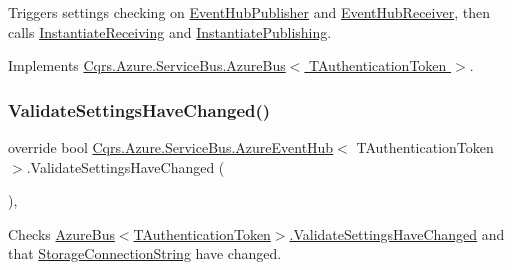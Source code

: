 Triggers settings checking on \hyperlink{classCqrs_1_1Azure_1_1ServiceBus_1_1AzureEventHub_a5f64ce36efaee0f676816c803620d05e_a5f64ce36efaee0f676816c803620d05e}{Event\+Hub\+Publisher} and \hyperlink{classCqrs_1_1Azure_1_1ServiceBus_1_1AzureEventHub_a1b12b47dbb9b9afe2014477a2e457c35_a1b12b47dbb9b9afe2014477a2e457c35}{Event\+Hub\+Receiver}, then calls \hyperlink{classCqrs_1_1Azure_1_1ServiceBus_1_1AzureEventHub_aa725781eddb65bdfe456a4fecb36fb6b_aa725781eddb65bdfe456a4fecb36fb6b}{Instantiate\+Receiving} and \hyperlink{classCqrs_1_1Azure_1_1ServiceBus_1_1AzureEventHub_a3747fb9fcb3de2a72c8a6d7bbd92db95_a3747fb9fcb3de2a72c8a6d7bbd92db95}{Instantiate\+Publishing}. 



Implements \hyperlink{classCqrs_1_1Azure_1_1ServiceBus_1_1AzureBus_ae501f84c4983bfa3b2ae4551749ac998_ae501f84c4983bfa3b2ae4551749ac998}{Cqrs.\+Azure.\+Service\+Bus.\+Azure\+Bus$<$ T\+Authentication\+Token $>$}.

\mbox{\label{classCqrs_1_1Azure_1_1ServiceBus_1_1AzureEventHub_afe8d6f93f97ab5658b81903af555632c_afe8d6f93f97ab5658b81903af555632c}} 
\subsubsection{\texorpdfstring{Validate\+Settings\+Have\+Changed()}{ValidateSettingsHaveChanged()}}
{\footnotesize\ttfamily override bool \hyperlink{classCqrs_1_1Azure_1_1ServiceBus_1_1AzureEventHub}{Cqrs.\+Azure.\+Service\+Bus.\+Azure\+Event\+Hub}$<$ T\+Authentication\+Token $>$.Validate\+Settings\+Have\+Changed (\begin{DoxyParamCaption}{ }\end{DoxyParamCaption})\hspace{0.3cm}{\ttfamily [protected]}, {\ttfamily [virtual]}}



Checks \hyperlink{classCqrs_1_1Azure_1_1ServiceBus_1_1AzureBus_a9fa1f5a74819100c40d8079ac6a6adb9_a9fa1f5a74819100c40d8079ac6a6adb9}{Azure\+Bus$<$\+T\+Authentication\+Token$>$.\+Validate\+Settings\+Have\+Changed} and that \hyperlink{classCqrs_1_1Azure_1_1ServiceBus_1_1AzureEventHub_a2b102538e8b72f9990578fa3bcbe4c12_a2b102538e8b72f9990578fa3bcbe4c12}{Storage\+Connection\+String} have changed. 

